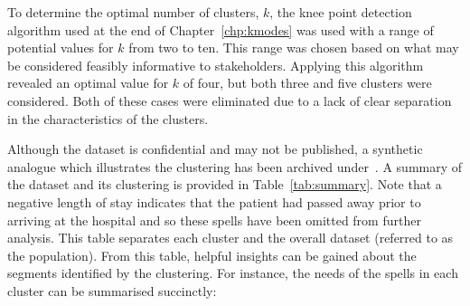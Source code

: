 To determine the optimal number of clusters, \(k\), the knee point detection
algorithm used at the end of Chapter~\ref{chp:kmodes} was used with a range of
potential values for \(k\) from two to ten. This range was chosen based on what
may be considered feasibly informative to stakeholders. Applying this algorithm
revealed an optimal value for \(k\) of four, but both three and five clusters
were considered. Both of these cases were eliminated due to a lack of clear
separation in the characteristics of the clusters.

\begin{table}
    \centering
    \resizebox{\textwidth}{!}{%
        
    }\caption{%
        A summary of clinical and condition-specific characteristics for each
        cluster and the population
    }\label{tab:summary}
\end{table}

Although the dataset is confidential and may not be published, a synthetic
analogue which illustrates the clustering has been archived
under~. A summary of the dataset and its clustering
is provided in Table~\ref{tab:summary}. Note that a negative length of stay
indicates that the patient had passed away prior to arriving at the hospital and
so these spells have been omitted from further analysis. This table separates
each cluster and the overall dataset (referred to as the population). From this
table, helpful insights can be gained about the segments identified by the
clustering. For instance, the needs of the spells in each cluster can be
summarised succinctly:

